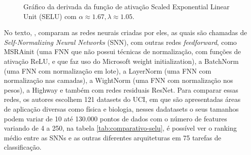 \begin{figure}[h!]
    \centering
    \caption{Gráfico da derivada da função de ativação Scaled Exponential Linear Unit (SELU) com $\alpha \approx 1.67, \lambda \approx 1.05$.}
    \label{fig:selu-derivada}
\end{figure}

No texto, \textcite{SELUArticle}, comparam as redes neurais criadas por eles, as quais são chamadas de \textit{Self-Normalizing Neural Networks} (SNN), com outras redes \textit{feedforward}, como MSRAinit (uma FNN que não possui técnicas de normalização, com funções de ativação ReLU, e que faz uso do Microsoft weight initialization), a BatchNorm (uma FNN com normalização em lote), a LayerNorm (uma FNN com normalização nas camadas), a WightNorm (uma FNN com normalização nos pesos), a Highway e também com redes residuais ResNet. Para comparar essas redes, os autores escolhem 121 datasets do UCI, em que são apresentadas áreas de aplicação diversas como física e biologia, nesses dadatasets o seus tamanhos podem variar de 10 até 130.000 pontos de dados com o número de features variando de 4 a 250, na tabela \ref{tab:comparativo-selu}, é possível ver o ranking médio entre as SNNs e as outras diferentes arquiteturas em 75 tarefas de classificação.

